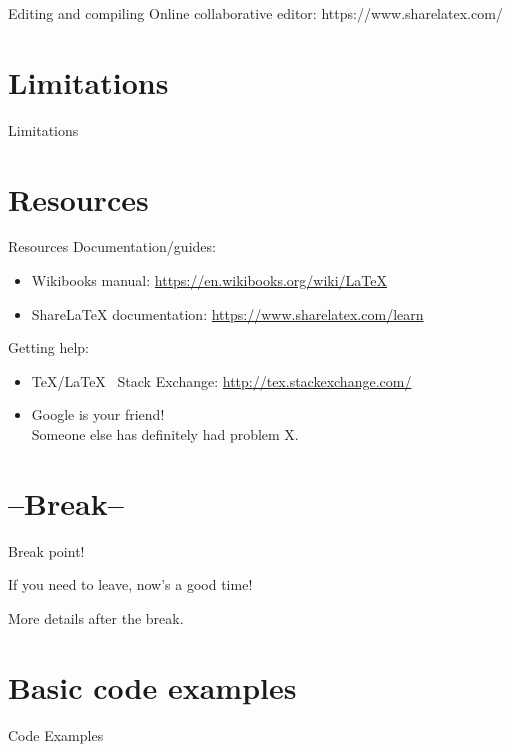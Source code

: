 \documentclass[xcolor={dvipsnames}]{beamer}
\begin{document}
\begin{frame}{Editing and compiling}
%
Online collaborative editor: https://www.sharelatex.com/
\end{frame}

\section{Limitations}
\begin{frame}{Limitations}
\end{frame}

\section{Resources}
\begin{frame}{Resources}
Documentation/guides:
\begin{itemize}
\item Wikibooks manual: \url{https://en.wikibooks.org/wiki/LaTeX}
\item ShareLaTeX documentation: \url{https://www.sharelatex.com/learn}
\end{itemize}
\vfill
Getting help:
\begin{itemize}
\item \TeX/\LaTeX~ Stack Exchange: \url{http://tex.stackexchange.com/}
\item Google is your friend!\\Someone else has definitely had problem X.
\end{itemize}
\end{frame}

\section{--Break--}
\begin{frame}{Break point!}
\begin{block}{}
\begin{center}
If you need to leave, now's a good time!

More details after the break.
\end{center}
\end{block}
\end{frame}

\section{Basic code examples}
\begin{frame}{Code Examples}
\end{frame}
\end{document}
